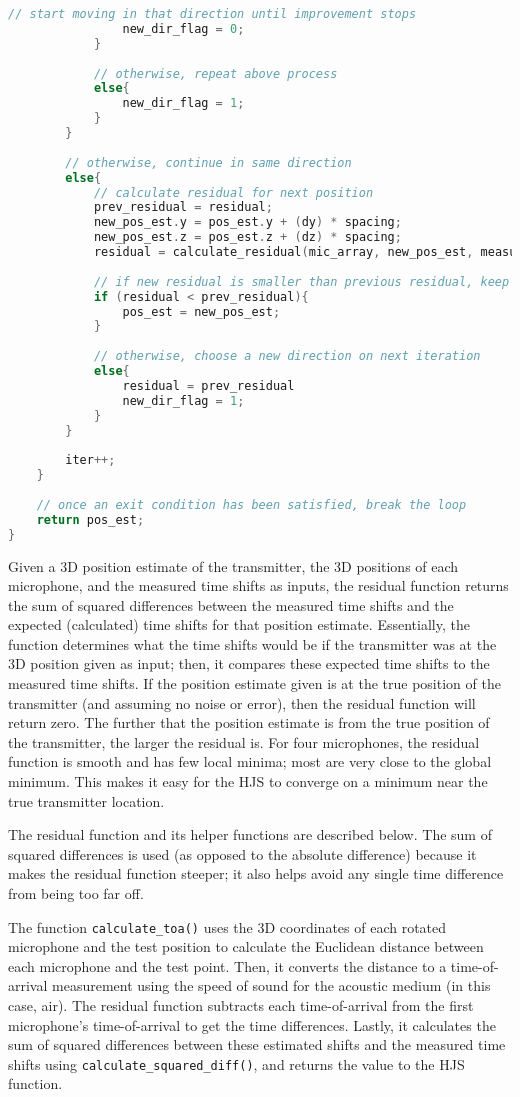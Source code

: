 \documentclass[11pt]{ucthesisCP}
\begin{document}
\begin{lstlisting}[language=C++]
				// start moving in that direction until improvement stops
				new_dir_flag = 0;
			}
			
			// otherwise, repeat above process
			else{
				new_dir_flag = 1;
			}
		}
		
		// otherwise, continue in same direction
		else{
			// calculate residual for next position
			prev_residual = residual;
			new_pos_est.y = pos_est.y + (dy) * spacing;
			new_pos_est.z = pos_est.z + (dz) * spacing;
			residual = calculate_residual(mic_array, new_pos_est, measured_time_shifts);
			
			// if new residual is smaller than previous residual, keep moving in that direction
			if (residual < prev_residual){
				pos_est = new_pos_est;
			}
			
			// otherwise, choose a new direction on next iteration
			else{
				residual = prev_residual
				new_dir_flag = 1;
			}
		}
		
		iter++;
	}
	
	// once an exit condition has been satisfied, break the loop
	return pos_est;
}
\end{lstlisting}

Given a 3D position estimate of the transmitter, the 3D positions of each microphone, and the measured time shifts as inputs, the residual function returns the sum of squared differences between the measured time shifts and the expected (calculated) time shifts for that position estimate. Essentially, the function determines what the time shifts would be if the transmitter was at the 3D position given as input; then, it compares these expected time shifts to the measured time shifts. If the position estimate given is at the true position of the transmitter (and assuming no noise or error), then the residual function will return zero. The further that the position estimate is from the true position of the transmitter, the larger the residual is. For four microphones, the residual function is smooth and has few local minima; most are very close to the global minimum. This makes it easy for the HJS to converge on a minimum near the true transmitter location.

The residual function and its helper functions are described below. The sum of squared differences is used (as opposed to the absolute difference) because it makes the residual function steeper; it also helps avoid any single time difference from being too far off. 

The function \verb|calculate_toa()| uses the 3D coordinates of each rotated microphone and the test position to calculate the Euclidean distance between each microphone and the test point. Then, it converts the distance to a time-of-arrival measurement using the speed of sound for the acoustic medium (in this case, air). The residual function subtracts each time-of-arrival from the first microphone’s time-of-arrival to get the time differences. Lastly, it calculates the sum of squared differences between these estimated shifts and the measured time shifts using \verb|calculate_squared_diff()|, and returns the value to the HJS function.
\end{document}
